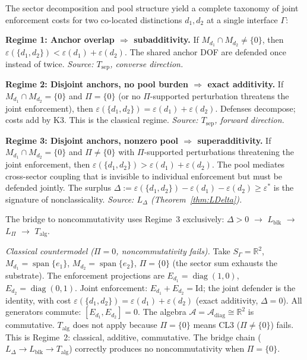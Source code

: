 \documentclass[11pt,a4paper]{article}
\theoremstyle{definition}
\newcommand{\eps}{\varepsilon}
\DeclareMathOperator{\spn}{span}
\DeclareMathOperator{\diag}{diag}
\begin{document}
\begin{tcolorbox}[apfbox, title={Three Regimes of Joint Enforcement Cost}]
The sector decomposition and pool structure yield a complete taxonomy of joint enforcement costs for two co-located distinctions $d_1, d_2$ at a single interface $\Gamma$:

\smallskip\noindent\textbf{Regime 1: Anchor overlap $\Rightarrow$ subadditivity.}  If $M_{d_1} \cap M_{d_2} \ne \{0\}$, then $\eps(\{d_1, d_2\}) < \eps(d_1) + \eps(d_2)$.  The shared anchor DOF are defended once instead of twice.  \textit{Source: $T_{\mathrm{sep}}$, converse direction.}

\smallskip\noindent\textbf{Regime 2: Disjoint anchors, no pool burden $\Rightarrow$ exact additivity.}  If $M_{d_1} \cap M_{d_2} = \{0\}$ and $\Pi = \{0\}$ (or no $\Pi$-supported perturbation threatens the joint enforcement), then $\eps(\{d_1, d_2\}) = \eps(d_1) + \eps(d_2)$.  Defenses decompose; costs add by K3.  This is the classical regime.  \textit{Source: $T_{\mathrm{sep}}$, forward direction.}

\smallskip\noindent\textbf{Regime 3: Disjoint anchors, nonzero pool $\Rightarrow$ superadditivity.}  If $M_{d_1} \cap M_{d_2} = \{0\}$ and $\Pi \ne \{0\}$ with $\Pi$-supported perturbations threatening the joint enforcement, then $\eps(\{d_1, d_2\}) > \eps(d_1) + \eps(d_2)$.  The pool mediates cross-sector coupling that is invisible to individual enforcement but must be defended jointly.  The surplus $\Delta := \eps(\{d_1,d_2\}) - \eps(d_1) - \eps(d_2) \ge \eps^*$ is the signature of nonclassicality.  \textit{Source: $L_\Delta$ (Theorem~\ref{thm:LDelta}).}

\smallskip\noindent The bridge to noncommutativity uses Regime~3 exclusively: $\Delta > 0$ $\to$ $L_{\mathrm{blk}}$ $\to$ $L_\Pi$ $\to$ $T_{\mathrm{alg}}$.

\smallskip\noindent\textit{Classical countermodel ($\Pi = 0$, noncommutativity fails).}  Take $S_\Gamma = \mathbb{R}^2$, $M_{d_1} = \spn\{e_1\}$, $M_{d_2} = \spn\{e_2\}$, $\Pi = \{0\}$ (the sector sum exhausts the substrate).  The enforcement projections are $E_{d_1} = \diag(1,0)$, $E_{d_2} = \diag(0,1)$.  Joint enforcement: $E_{d_1} + E_{d_2} = \mathrm{Id}$; the joint defender is the identity, with cost $\eps(\{d_1,d_2\}) = \eps(d_1) + \eps(d_2)$ (exact additivity, $\Delta = 0$).  All generators commute: $[E_{d_1}, E_{d_2}] = 0$.  The algebra $\mathcal{A} = \mathcal{A}_{\mathrm{diag}} \cong \mathbb{R}^2$ is commutative.  $T_{\mathrm{alg}}$ does not apply because $\Pi = \{0\}$ means CL3 ($\Pi \ne \{0\}$) fails.  This is Regime~2: classical, additive, commutative.  The bridge chain ($L_\Delta \to L_{\mathrm{blk}} \to T_{\mathrm{alg}}$) correctly produces no noncommutativity when $\Pi = \{0\}$.
\end{tcolorbox}
\end{document}
